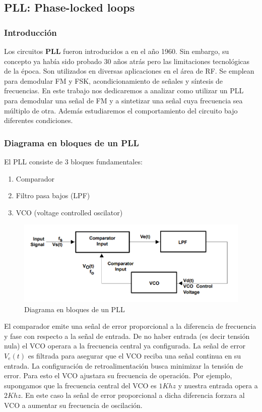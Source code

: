 

	\subsection{PLL: Phase-locked loops}
	\subsubsection{Introducción}
	Los circuitos \textbf{PLL} fueron introducidos a en el año 1960. Sin embargo, su concepto ya había sido probado 30 años atrás pero las limitaciones tecnológicas de la época. Son utilizados en diversas aplicaciones en el área de RF. Se emplean para demodular FM y FSK, acondicionamiento de señales y síntesis de frecuencias. En este trabajo nos dedicaremos a analizar como utilizar un PLL para demodular una señal de FM y a sintetizar una señal cuya frecuencia sea múltiplo de otra. Además estudiaremos el comportamiento del circuito bajo diferentes condiciones.
	
	\subsubsection{Diagrama en bloques de un PLL}
	El PLL consiste de 3 bloques fundamentales:
	
	\begin{enumerate}
		\item  Comparador
		\item  Filtro pasa bajos (LPF)
		\item  VCO (voltage controlled oscilator) 
	\end{enumerate}
	
	\begin{figure}[H]
		\includegraphics[width=\linewidth]{ImagenesVarias/PLLblockDiagram.PNG}
		\caption{Diagrama en bloques de un PLL}
	\end{figure}
El comparador emite una señal de error proporcional a la diferencia de frecuencia y fase con respecto a la señal de entrada. De no haber entrada (es decir tensión nula) el VCO operara a la frecuencia central ya configurada. La señal de error $V_e(t)$ es filtrada para asegurar que el VCO reciba una señal continua en su entrada. La configuración de retroalimentación busca minimizar la tensión de error. Para esto el VCO ajustara su frecuencia de operación. Por ejemplo, supongamos que la frecuencia central del VCO es $1Khz$ y nuestra entrada opera a $2Khz$. En este caso la señal de error proporcional a dicha diferencia forzara al VCO a aumentar su frecuencia de oscilación. 


